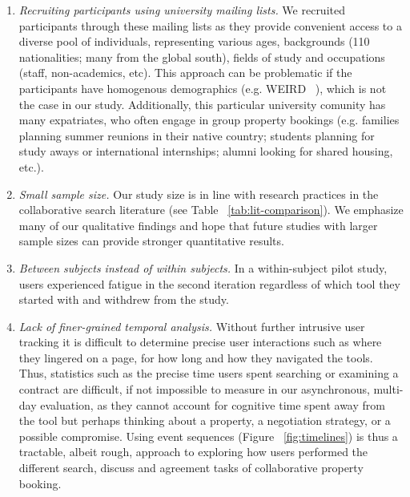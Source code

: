 \begin{enumerate}
    \item \textit{Recruiting participants using university mailing lists.} We recruited participants through these mailing lists as they provide convenient access to a diverse pool of individuals, representing various ages, backgrounds (110 nationalities; many from the global south), fields of study and occupations (staff, non-academics, etc). This approach can be problematic if the participants have homogenous demographics (e.g. WEIRD ~\cite{weird}), which is not the case in our study. Additionally, this particular university comunity has many expatriates, who often engage in group property bookings (e.g. families planning summer reunions in their native country; students planning for study aways or international internships; alumni looking for shared housing, etc.).



    \item \textit{Small sample size.} Our study size is in line with research practices in the collaborative search literature (see Table ~\ref{tab:lit-comparison}). We emphasize many of our qualitative findings and hope that future studies with larger sample sizes can provide stronger quantitative results.
    



    \item \textit{Between subjects instead of within subjects.} In a within-subject pilot study, users experienced fatigue in the second iteration regardless of which tool they started with and withdrew from the study. 
    
    \item \textit{Lack of finer-grained temporal analysis.} Without further intrusive user tracking it is difficult to determine precise user interactions such as where they lingered on a page, for how long and how they navigated the tools. Thus, statistics such as the precise time users spent searching or examining a contract are difficult, if not impossible to measure in our asynchronous, multi-day evaluation, as they cannot account for cognitive time spent away from the tool but perhaps thinking about a property, a negotiation strategy, or a possible compromise. Using event sequences (Figure ~\ref{fig:timelines}) is thus a tractable, albeit rough, approach to exploring how users performed the different search, discuss and agreement tasks of collaborative property booking.


\end{enumerate}
